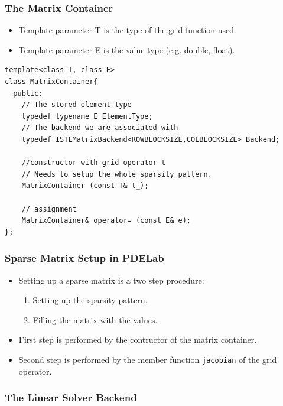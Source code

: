 {\begin{frame}[fragile]
  \frametitle{The Matrix Container}
\begin{itemize}
  \item Template parameter T is the type of the grid function used.
  \item Template parameter E is the value type (e.g. double, float).
  \end{itemize}
  \begin{lstlisting}[basicstyle=\scriptsize]
template<class T, class E>
class MatrixContainer{
  public:
    // The stored element type
    typedef typename E ElementType;
    // The backend we are associated with
    typedef ISTLMatrixBackend<ROWBLOCKSIZE,COLBLOCKSIZE> Backend;
      
    //constructor with grid operator t
    // Needs to setup the whole sparsity pattern.
    MatrixContainer (const T& t_);
      
    // assignment
    MatrixContainer& operator= (const E& e);
};
  \end{lstlisting}
\end{frame}
\begin{frame}[fragile]
  \frametitle{Sparse Matrix Setup in PDELab}
  \begin{itemize}
  \item Setting up a sparse matrix is a two step procedure:
    \begin{enumerate}
    \item Setting up the sparsity pattern.
    \item Filling the matrix with the values.
    \end{enumerate}
  \item First step is performed by the contructor of the matrix
    container.
  \item Second step is performed by the member function
    \lstinline!jacobian! of the grid operator.
  \end{itemize}

\end{frame}

\subsubsection{The Linear Solver Backend}
\label{sec:line-solv-back}

}
